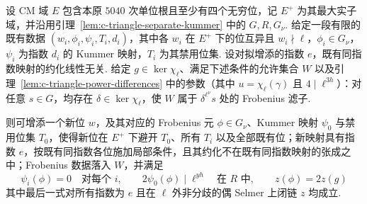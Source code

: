 \begin{lemma}[延拓素数三角的前缀]
\label{lem:c-triangle-next-prime}
\emitthmsource
设 CM 域 $E$ 包含本原 $5040$ 次单位根且至少有四个无穷位，记 $E^+$ 为其最大实子域，并沿用引理~\ref{lem:c-triangle-separate-kummer} 中的 $G,R,G_\nu$. 给定一段有限的既有数据 $(w_i,\phi_i,\psi_i,T_i,d_i)$，其中各 $w_i$ 在 $E^+$ 下的位互异且 $w_i\nmid\ell$，$\phi_i\in G_\nu$，$\psi_i$ 为指数 $d_i$ 的 Kummer 映射，$T_i$ 为其禁用位集. 设对拟增添的指数 $e$，既有同指数映射的约化线性无关. 给定 $g\in\ker\chi_\ell$、满足下述条件的允许集合 $W$ 以及引理~\ref{lem:c-triangle-power-differences} 中的参数（其中 $u=\chi_\ell(\gamma)$ 且 $4\mid\ell^{3h}$）：对任意 $s\in G$，均存在 $\delta\in\ker\chi_\ell$，使 $W$ 属于 $\delta^{\ell^\nu}s$ 处的 Frobenius 滤子.

则可增添一个新位 $w$，及其对应的 Frobenius 元 $\phi\in G_\nu$、Kummer 映射 $\psi_0$ 与禁用位集 $T_0$，使得新位在 $E^+$ 下避开 $T_0$、所有 $T_i$ 以及全部既有位；新映射具有指数 $e$，按既有同指数各位施加局部条件，且其约化不在既有同指数映射的张成之中；Frobenius 数据落入 $W$，并满足
\[
 \psi_i(\phi)=0\quad\text{对每个 }i,\qquad
 2\psi_0(\phi)\mid\ell^{yh}\quad\text{在 }R\text{ 中},\qquad
 z(\phi)=2z(g)
\]
其中最后一式对所有指数为 $e$ 且在 $\ell$ 外非分歧的偶 Selmer 上闭链 $z$ 均成立.
\end{lemma}
